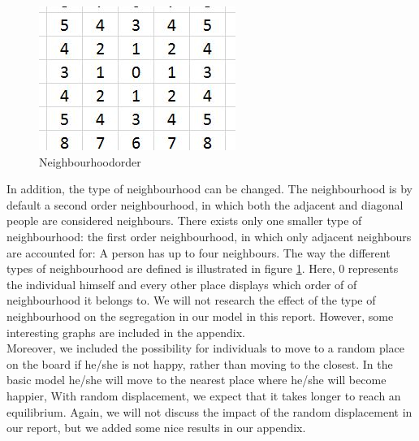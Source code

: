 
\begin{figure}
\vspace{-20pt}
\centering
\includegraphics[scale=0.5]{buurtorde.jpg}
\caption{Neighbourhoodorder}
\vspace{-15pt}
\label{fig:neighbourhood}
\end{figure}

In addition,  the type of neighbourhood can be changed.
The neighbourhood is  by default a second order neighbourhood, in which both the adjacent and diagonal people are considered neighbours.
There exists only one smaller type of neighbourhood: the first order neighbourhood, in which only adjacent neighbours are accounted for: A person has up to four neighbours.
The way the different types of neighbourhood are defined is illustrated in figure \ref{fig:neighbourhood}.
Here, $0$ represents the individual himself and every other place displays which order of  of neighbourhood it belongs to.
We will not research the effect of the type of neighbourhood on the segregation in our model in this report.
However, some interesting graphs are included in the appendix.\\

Moreover, we included the possibility for individuals to move to a random place on the board if he/she is not happy, rather than moving to the closest.
In the basic model he/she will move to the nearest place where he/she will become happier, With random displacement, we expect that it takes longer to reach an equilibrium.
Again, we will not discuss the impact of the random displacement in our report, but we added some nice results in our appendix.\\

